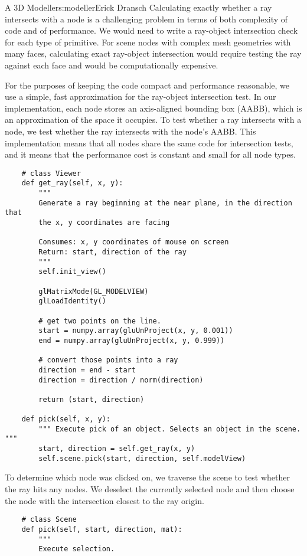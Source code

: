 \begin{aosachapter}{A 3D Modeller}{s:modeller}{Erick Dransch}
Calculating exactly whether a ray intersects with a node is a
challenging problem in terms of both complexity of code and of
performance. We would need to write a ray-object intersection check for
each type of primitive. For scene nodes with complex mesh geometries
with many faces, calculating exact ray-object intersection would require
testing the ray against each face and would be computationally
expensive.

For the purposes of keeping the code compact and performance reasonable,
we use a simple, fast approximation for the ray-object intersection
test. In our implementation, each node stores an axis-aligned bounding
box (AABB), which is an approximation of the space it occupies. To test
whether a ray intersects with a node, we test whether the ray intersects
with the node's AABB. This implementation means that all nodes share the
same code for intersection tests, and it means that the performance cost
is constant and small for all node types.

\begin{verbatim}
    # class Viewer
    def get_ray(self, x, y):
        """ 
        Generate a ray beginning at the near plane, in the direction that
        the x, y coordinates are facing 

        Consumes: x, y coordinates of mouse on screen 
        Return: start, direction of the ray 
        """
        self.init_view()
    
        glMatrixMode(GL_MODELVIEW)
        glLoadIdentity()
    
        # get two points on the line.
        start = numpy.array(gluUnProject(x, y, 0.001))
        end = numpy.array(gluUnProject(x, y, 0.999))
    
        # convert those points into a ray
        direction = end - start
        direction = direction / norm(direction)
    
        return (start, direction)
    
    def pick(self, x, y):
        """ Execute pick of an object. Selects an object in the scene. """
        start, direction = self.get_ray(x, y)
        self.scene.pick(start, direction, self.modelView)
\end{verbatim}

To determine which node was clicked on, we traverse the scene to test
whether the ray hits any nodes. We deselect the currently selected node
and then choose the node with the intersection closest to the ray
origin.

\begin{verbatim}
    # class Scene
    def pick(self, start, direction, mat):
        """ 
        Execute selection.
            

\end{verbatim}
\end{aosachapter}
